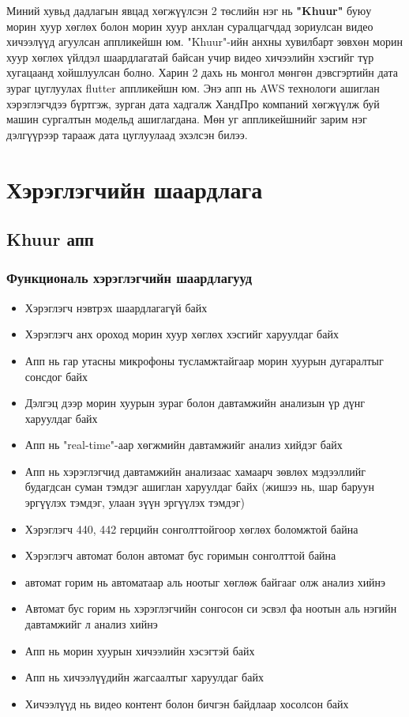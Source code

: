 \quad \quad Миний хувьд дадлагын явцад хөгжүүлсэн 2 төслийн нэг нь \textbf{"Khuur"} буюу морин хуур хөглөх болон морин хуур анхлан суралцагчдад зориулсан видео хичээлүүд агуулсан аппликейшн юм. "Khuur"-ийн анхны хувилбарт зөвхөн морин хуур хөглөх үйлдэл шаардлагатай байсан учир видео хичээлийн хэсгийг түр хугацаанд хойшлуулсан болно. Харин 2 дахь нь монгол мөнгөн дэвсгэртийн дата зураг цуглуулах flutter аппликейшн юм. Энэ апп нь AWS технологи ашиглан хэрэглэгчдээ бүртгэж, зурган дата хадгалж ХандПро компаний хөгжүүлж буй машин сургалтын модельд ашиглагдана. Мөн уг аппликейшнийг зарим нэг дэлгүүрээр тарааж дата цуглуулаад эхэлсэн билээ.
\section{Хэрэглэгчийн шаардлага}
    \subsection{Khuur апп}
        \subsubsection{Функциональ хэрэглэгчийн шаардлагууд}
         \begin{itemize}
            \item Хэрэглэгч нэвтрэх шаардлагагүй байх
            \item Хэрэглэгч анх ороход морин хуур хөглөх хэсгийг харуулдаг байх
            \item Апп нь гар утасны микрофоны тусламжтайгаар морин хуурын дугаралтыг сонсдог байх 
            \item Дэлгэц дээр морин хуурын зураг болон давтамжийн анализын үр дүнг харуулдаг байх
            \item Апп нь "real-time"-аар хөгжмийн давтамжийг анализ хийдэг байх
            \item Апп нь хэрэглэгчид давтамжийн анализаас хамаарч зөвлөх мэдээллийг будагдсан суман тэмдэг ашиглан харуулдаг байх (жишээ нь, шар баруун эргүүлэх тэмдэг, улаан зүүн эргүүлэх тэмдэг) 
            \item Хэрэглэгч 440, 442 герцийн сонголттойгоор хөглөх боломжтой байна
            \item Хэрэглэгч автомат болон автомат бус горимын сонголттой байна
            \item автомат горим нь автоматаар аль ноотыг хөглөж байгааг олж анализ хийнэ 
            \item Автомат бус горим нь хэрэглэгчийн сонгосон си эсвэл фа ноотын аль нэгийн давтамжийг л анализ хийнэ
            \item Апп нь морин хуурын хичээлийн хэсэгтэй байх
            \item Апп нь хичээлүүдийн жагсаалтыг харуулдаг байх
            \item Хичээлүүд нь видео контент болон бичгэн байдлаар хосолсон байх
        \end{itemize}

